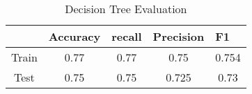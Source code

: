\begin{table}[b!]                    %
\caption{\centering Decision Tree Evaluation}
    \centering
    \begin{tabular}{c c c c c }            %
        \toprule 
        
          & \multicolumn{1}{l}{Accuracy} & \multicolumn{1}{l}{recall} & \multicolumn{1}{l}{Precision} & \multicolumn{1}{l}{F1} \\
        \midrule
    Train   & 0.77 & 0.77 & 0.75 & 0.754 \\
    Test   & 0.75 & 0.75 & 0.725 & 0.73 \\

        \bottomrule
    \end{tabular}
    \vspace{10pt}
    \vspace{-5pt}
    \label{tab:dt1}
\end{table}